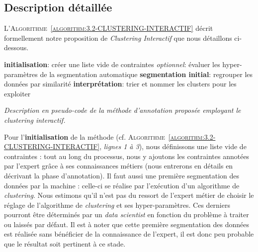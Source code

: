 		
		\subsection{Description détaillée}
		\label{section:3.2.2-DESCRIPTION-THEORIQUE-DETAILLEE}
		
		L'\textsc{Algorithme~\ref{algorithm:3.2-CLUSTERING-INTERACTIF}} décrit formellement notre proposition de \textit{Clustering Interactif} que nous détaillons ci-dessous.
		\begin{algorithm}
			\textbf{initialisation}: créer une liste vide de contraintes \;
			\textit{optionnel}: évaluer les hyper-paramètres de la segmentation automatique \;
			\textbf{segmentation initial}: regrouper les données par similarité \;
			\textbf{interprétation}: trier et nommer les clusters pour les exploiter \;
			\caption{\textit{
				Description en pseudo-code de la méthode d'annotation proposée employant le \textit{clustering} interactif.
			}}
			\label{algorithm:3.2-CLUSTERING-INTERACTIF}
		\end{algorithm}
		
		Pour l'\textbf{initialisation} de la méthode (cf. \textsc{Algorithme~\ref{algorithm:3.2-CLUSTERING-INTERACTIF}}, \textit{lignes 1 à 3}), nous définissons une liste vide de contraintes : tout au long du processus, nous y ajoutons les contraintes annotées par l'expert grâce à ses connaissances métiers (nous entrerons en détails en décrivant la phase d'annotation).
		Il faut aussi une première segmentation des données par la machine : celle-ci se réalise par l'exécution d'un algorithme de \textit{clustering}.
		Nous estimons qu'il n'est pas du ressort de l'expert métier de choisir le réglage de l'algorithme de \textit{clustering} et ses hyper-paramètres.
		Ces derniers pourront être déterminés par un \textit{data scientist} en fonction du problème à traiter ou laissés par défaut.
		Il est à noter que cette première segmentation des données est réalisée sans bénéficier de la connaissance de l'expert, il est donc peu probable que le résultat soit pertinent à ce stade.
		
